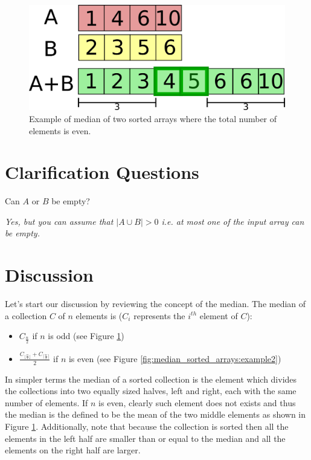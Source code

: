 \begin{figure}
	\label{fig:median_sorted_arrays:example1}
	\centering
	\includegraphics[scale=1.0]{sources/median_sorted_arrays/images/example1}
	\caption[Example of median of two sorted arrays.]{Example of median of two sorted arrays where the total number of elements is even.}
\end{figure}


\section{Clarification Questions}

\begin{QandA}
	\item \begin{questionitem} \begin{question} Can $A$ or $B$ be empty?  \end{question} 	 
    \begin{answered}
		\textit{Yes, but you can assume that $|A \cup B| > 0$ i.e. at most one of the input array can be empty.}
	\end{answered} \end{questionitem}
	
\end{QandA}

\section{Discussion}
\label{median_sorted_arrays:sec:discussion}
Let's start our discussion by reviewing the concept of the median. The median of a collection $C$ of $n$
elements is ($C_i$ represents the $i^{th}$ element of $C$):
\begin{itemize}
	\item $C_{\frac{n}{2}}$ if $n$ is odd (see Figure \ref{fig:median_sorted_arrays:example1})
	\item $\frac{C_{ \lfloor \frac{n}{2} \rfloor    }+C_{ \lceil \frac{n}{2} \rceil   }}{2}$ if $n$ is even (see Figure
	\ref{fig:median_sorted_arrays:example2})
\end{itemize}
In simpler terms the median of a sorted collection is the element which divides the collections into
two equally sized halves, left and right, each with the same number of elements. 
If $n$ is even, clearly such element does not exists and thus the median is the defined to be the mean of the two middle
elements as shown in Figure \ref{fig:median_sorted_arrays:example1}.
Additionally, note that because the collection is sorted then all the elements in the left half are smaller than or equal to
the median and all the elements on the right half are larger. 

